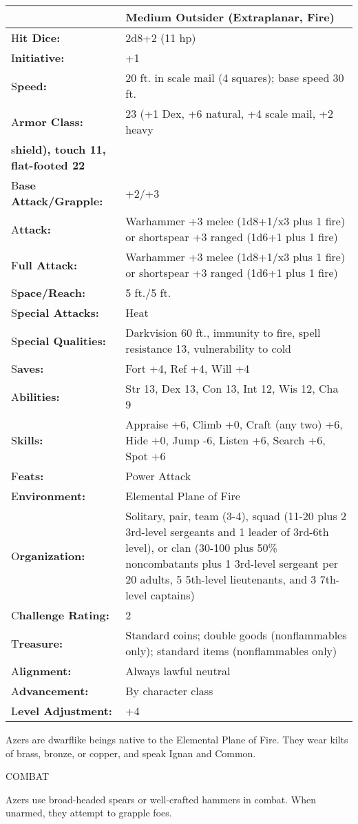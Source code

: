 \documentclass{article}
\begin{document}
\begin{tabular}{|>{\raggedright}p{124pt}|>{\raggedright}p{201pt}|}
\hline
  & Medium Outsider (Extraplanar, Fire)\tabularnewline
\hline
H\textbf{it Dice:} & 2d8+2 (11 hp)\tabularnewline
\hline
I\textbf{nitiative:} & +1\tabularnewline
\hline
S\textbf{peed:} & 20 ft. in scale mail (4 squares); base speed 30 ft.\tabularnewline
\hline
A\textbf{rmor Class:} & 23 (+1 Dex, +6 natural, +4 scale mail, +2 heavy\tabularnewline
\hline
s\textbf{hield), touch 11, flat-footed 22} & \tabularnewline
\hline
B\textbf{ase Attack/Grapple:} & +2/+3\tabularnewline
\hline
A\textbf{ttack:} & Warhammer +3 melee (1d8+1/x3 plus 1 fire) or shortspear +3 ranged 
(1d6+1 plus 1 fire)\tabularnewline
\hline
F\textbf{ull Attack:} & Warhammer +3 melee (1d8+1/x3 plus 1 fire) or shortspear 
+3 ranged (1d6+1 plus 1 fire)\tabularnewline
\hline
S\textbf{pace/Reach:} & 5 ft./5 ft.\tabularnewline
\hline
S\textbf{pecial Attacks:} & Heat\tabularnewline
\hline
S\textbf{pecial Qualities:} & Darkvision 60 ft., immunity to fire, spell resistance 
13, vulnerability to cold\tabularnewline
\hline
S\textbf{aves:} & Fort +4, Ref +4, Will +4\tabularnewline
\hline
A\textbf{bilities:} & Str 13, Dex 13, Con 13, Int 12, Wis 12, Cha 9\tabularnewline
\hline
S\textbf{kills:} & Appraise +6, Climb +0, Craft (any two) +6, Hide +0, Jump -6, 
Listen +6, Search +6, Spot +6\tabularnewline
\hline
F\textbf{eats:} & Power Attack\tabularnewline
\hline
E\textbf{nvironment:} & Elemental Plane of Fire\tabularnewline
\hline
O\textbf{rganization:} & Solitary, pair, team (3-4), squad (11-20 plus 2 3rd-level 
sergeants and 1 leader of 3rd-6th level), or clan (30-100 plus 50\% noncombatants 
plus 1 3rd-level sergeant per 20 adults, 5 5th-level lieutenants, and 3 7th-level 
captains)\tabularnewline
\hline
C\textbf{hallenge Rating:} & 2\tabularnewline
\hline
T\textbf{reasure:} & Standard coins; double goods (nonflammables only); standard 
items (nonflammables only)\tabularnewline
\hline
A\textbf{lignment:} & Always lawful neutral\tabularnewline
\hline
A\textbf{dvancement:} & By character class\tabularnewline
\hline
L\textbf{evel Adjustment:} & +4\tabularnewline
\hline
\end{tabular}

Azers are dwarflike beings native to the Elemental Plane of Fire. They wear kilts 
of brass, bronze, or copper, and speak Ignan and Common.

COMBAT

Azers use broad-headed spears or well-crafted hammers in combat. When unarmed, 
they attempt to grapple foes.
\end{document}
